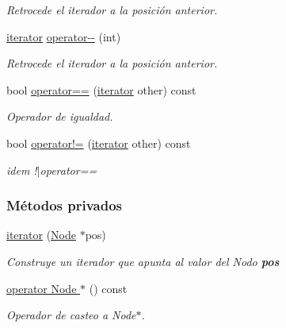 \begin{DoxyCompactItemize}
\begin{DoxyCompactList}\small\item\em \-Retrocede el iterador a la posición anterior. \end{DoxyCompactList}\item 
\hyperlink{classaed2_1_1iterator_1_1iterator}{iterator} \hyperlink{classaed2_1_1iterator_1_1iterator_a6bd61026c75767d0d41e45229144e9d0_a6bd61026c75767d0d41e45229144e9d0}{operator-\/-\/} (int)
\begin{DoxyCompactList}\small\item\em \-Retrocede el iterador a la posición anterior. \end{DoxyCompactList}\item 
bool \hyperlink{classaed2_1_1iterator_1_1iterator_a479ef64daa1f0e82b05fa1f80d57f479_a479ef64daa1f0e82b05fa1f80d57f479}{operator==} (\hyperlink{classaed2_1_1iterator_1_1iterator}{iterator} other) const 
\begin{DoxyCompactList}\small\item\em \-Operador de igualdad. \end{DoxyCompactList}\item 
bool \hyperlink{classaed2_1_1iterator_1_1iterator_a8facdf09114b97042cf3d6403ba1d719_a8facdf09114b97042cf3d6403ba1d719}{operator!=} (\hyperlink{classaed2_1_1iterator_1_1iterator}{iterator} other) const 
\begin{DoxyCompactList}\small\item\em idem !$|$operator== \end{DoxyCompactList}\end{DoxyCompactItemize}
\subsubsection*{\-Métodos privados}
\begin{DoxyCompactItemize}
\item 
\hyperlink{classaed2_1_1iterator_1_1iterator_ae005a5a576e31702ee17841c74e55684_ae005a5a576e31702ee17841c74e55684}{iterator} (\hyperlink{structaed2_1_1iterator_1_1Node}{\-Node} $\ast$pos)
\begin{DoxyCompactList}\small\item\em \-Construye un iterador que apunta al valor del \-Nodo {\bfseries pos} \end{DoxyCompactList}\item 
\hyperlink{classaed2_1_1iterator_1_1iterator_a12950b9a0659e6b9314b1a3a48bd50ac_a12950b9a0659e6b9314b1a3a48bd50ac}{operator Node $\ast$} () const 
\begin{DoxyCompactList}\small\item\em \-Operador de casteo a \-Node$\ast$. \end{DoxyCompactList}\end{DoxyCompactItemize}

